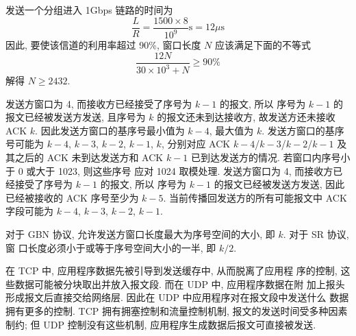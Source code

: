 \documentclass[11pt]{homework}
\begin{document}
\maketitle
\question
发送一个分组进入 1Gbps 链路的时间为
\begin{equation}
    \frac{ L }{ R } = \frac{ 1500 \times 8 }{ 10^{9} } \text{s} = 12 \mu\text{s}
\end{equation}
因此, 要使该信道的利用率超过 90\%, 窗口长度 $N$ 应该满足下面的不等式
\begin{equation}
    \frac{ 12 N }{ 30 \times 10^{3} + N } \geqslant 90\%
\end{equation}
解得 $N\geqslant 2432$.

\question
\begin{alphaparts}
    \questionpart 发送方窗口为 4, 而接收方已经接受了序号为 $k - 1$ 的报文, 所以
    序号为 $k - 1$ 的报文已经被发送方发送, 且序号为 $k$ 的报文还未到达接收方,
    故发送方还未接收 ACK $k$. 因此发送方窗口的基序号最小值为 $k - 4$, 最大值为
    $k$. 发送方窗口的基序号可能为 $k - 4$, $k - 3$, $k - 2$, $k - 1$, $k$,
    分别对应 ACK $k - 4$/$k - 3$/$k - 2$/$k - 1$ 及其之后的 ACK 未到达发送方和
    ACK $k - 1$ 已到达发送方的情况. 若窗口内序号小于 0 或大于 1023, 则这些序号
    应对 1024 取模处理.
    \questionpart 发送方窗口为 4, 而接收方已经接受了序号为 $k - 1$ 的报文, 所以
    序号为 $k - 1$ 的报文已经被发送方发送, 因此已经被接收的 ACK 序号至少为
    $k - 5$. 当前传播回发送方的所有可能报文中 ACK 字段可能为 $k - 4$, $k - 3$,
    $k - 2$, $k - 1$.
\end{alphaparts}

\question
对于 GBN 协议, 允许发送方窗口长度最大为序号空间的大小, 即 $k$. 对于 SR 协议, 窗
口长度必须小于或等于序号空间大小的一半, 即 $k / 2$.

\question
\begin{alphaparts}
    \questionpart 在 TCP 中, 应用程序数据先被引导到发送缓存中, 从而脱离了应用程
    序的控制, 这些数据可能被分块取出并放入报文段. 而在 UDP 中, 应用程序数据在附
    加上报头形成报文后直接交给网络层. 因此在 UDP 中应用程序对在报文段中发送什么
    数据拥有更多的控制.
    \questionpart TCP 拥有拥塞控制和流量控制机制, 报文的发送时间受多种因素制约;
    但 UDP 控制没有这些机制, 应用程序生成数据后报文可直接被发送.
\end{alphaparts}
\end{document}
